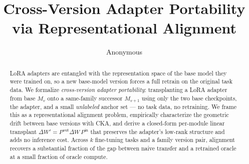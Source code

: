 \documentclass[11pt]{article}
\title{Cross-Version Adapter Portability via Representational Alignment}
\author{Anonymous}
\date{}
\begin{document}
\maketitle

\begin{abstract}
LoRA adapters are entangled with the representation space of the base model
they were trained on, so a new base-model version forces a full retrain on the
original task data. We formalize \emph{cross-version adapter portability}:
transplanting a LoRA adapter from base $M_v$ onto a same-family successor
$M_{v+1}$ using only the two base checkpoints, the adapter, and a small
\emph{unlabeled} anchor set --- no task data, no retraining. We frame this as a
representational alignment problem, empirically characterize the geometric drift
between base versions with CKA, and derive a closed-form per-module linear
transplant $\Delta W' = P^{\mathrm{out}}\Delta W\,P^{\mathrm{in}}$ that preserves
the adapter's low-rank structure and adds no inference cost. Across
$k$ fine-tuning tasks and a family version pair, alignment recovers a substantial
fraction of the gap between naive transfer and a retrained oracle at a small
fraction of oracle compute.
\end{abstract}





















\end{document}
